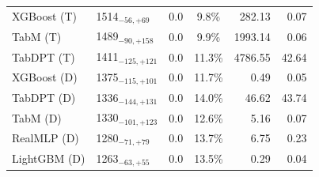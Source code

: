 \begin{tabular}{llccrr}
XGBoost (T) & 1514${}_{-56,+69}$ & 0.0 & 9.8\% & 282.13 & 0.07 \\
TabM (T) & 1489${}_{-90,+158}$ & 0.0 & 9.9\% & 1993.14 & 0.06 \\
TabDPT (T) & 1411${}_{-125,+121}$ & 0.0 & 11.3\% & 4786.55 & 42.64 \\
XGBoost (D) & 1375${}_{-115,+101}$ & 0.0 & 11.7\% & 0.49 & 0.05 \\
TabDPT (D) & 1336${}_{-144,+131}$ & 0.0 & 14.0\% & 46.62 & 43.74 \\
TabM (D) & 1330${}_{-101,+123}$ & 0.0 & 12.6\% & 5.16 & 0.07 \\
RealMLP (D) & 1280${}_{-71,+79}$ & 0.0 & 13.7\% & 6.75 & 0.23 \\
LightGBM (D) & 1263${}_{-63,+55}$ & 0.0 & 13.5\% & 0.29 & 0.04 \\
\bottomrule
\end{tabular}

